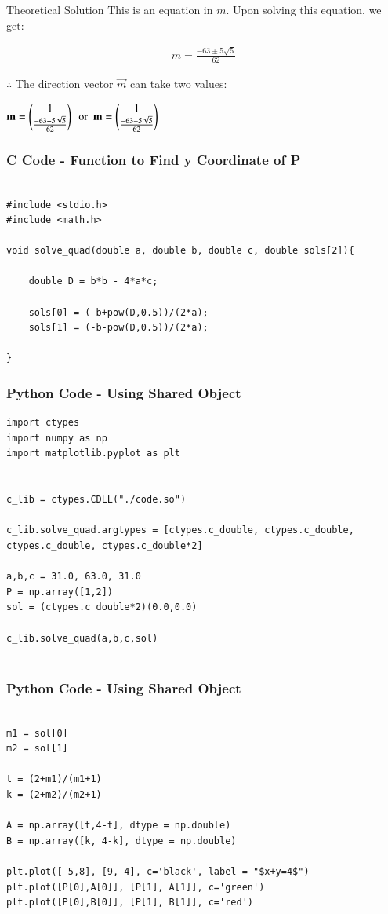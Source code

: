 \documentclass{beamer}
\begin{document}
\begin{frame}{Theoretical Solution}
This is an equation in $m$. Upon solving this equation, we get:

\begin{align}
    m = \frac{-63 \pm 5\sqrt{5}}{62}
\end{align}

$\therefore$ The direction vector $\vec{m}$ can take two values:
\begin{center}
    $\mathbf{m} = \begin{pmatrix}1\\\frac{-63 + 5\sqrt{5}}{62}\end{pmatrix} \ \ \text{or} \ \ \mathbf{m} = \begin{pmatrix}1\\\frac{-63 - 5\sqrt{5}}{62}\end{pmatrix}$
\end{center}
\end{frame}


\begin{frame}[fragile]
    \frametitle{C Code - Function to Find y Coordinate of P}

    \begin{lstlisting}

#include <stdio.h>
#include <math.h>

void solve_quad(double a, double b, double c, double sols[2]){
   
    double D = b*b - 4*a*c;
   
    sols[0] = (-b+pow(D,0.5))/(2*a);
    sols[1] = (-b-pow(D,0.5))/(2*a);
   
}
    \end{lstlisting}

\end{frame}

\begin{frame}[fragile]
    \frametitle{Python Code - Using Shared Object}
    \begin{lstlisting}
import ctypes
import numpy as np
import matplotlib.pyplot as plt


c_lib = ctypes.CDLL("./code.so")

c_lib.solve_quad.argtypes = [ctypes.c_double, ctypes.c_double, ctypes.c_double, ctypes.c_double*2]

a,b,c = 31.0, 63.0, 31.0
P = np.array([1,2])
sol = (ctypes.c_double*2)(0.0,0.0)

c_lib.solve_quad(a,b,c,sol)


\end{lstlisting}
\end{frame}

\begin{frame}[fragile]
    \frametitle{Python Code - Using Shared Object}
    \begin{lstlisting}

m1 = sol[0]
m2 = sol[1]

t = (2+m1)/(m1+1)
k = (2+m2)/(m2+1)

A = np.array([t,4-t], dtype = np.double)
B = np.array([k, 4-k], dtype = np.double)

plt.plot([-5,8], [9,-4], c='black', label = "$x+y=4$")
plt.plot([P[0],A[0]], [P[1], A[1]], c='green')
plt.plot([P[0],B[0]], [P[1], B[1]], c='red')


\end{lstlisting}
\end{frame}
\end{document}
